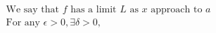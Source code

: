 \documentclass[preview]{standalone}
\begin{document}
\begin{align*}
{\text{We say that } f \text{ has a limit } L \text{ as } x \text{ approach to } a} \\\text{For any }\epsilon > 0, \exists \delta > 0,
\end{align*}
\end{document}
